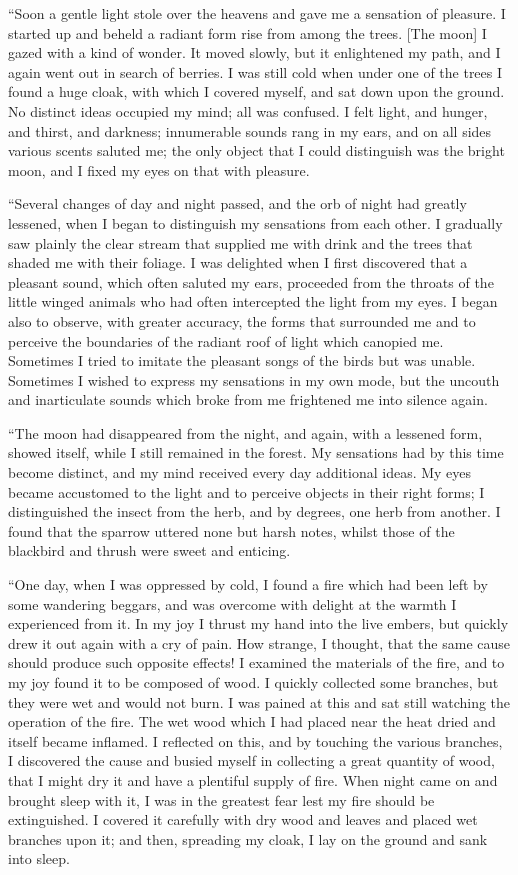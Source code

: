 \documentclass[12pt,openright]{book}
\begin{document}
“Soon a gentle light stole over the heavens and gave me a sensation of pleasure. I started up and beheld a radiant form rise from among the trees. [The moon] I gazed with a kind of wonder. It moved slowly, but it enlightened my path, and I again went out in search of berries. I was still cold when under one of the trees I found a huge cloak, with which I covered myself, and sat down upon the ground. No distinct ideas occupied my mind; all was confused. I felt light, and hunger, and thirst, and darkness; innumerable sounds rang in my ears, and on all sides various scents saluted me; the only object that I could distinguish was the bright moon, and I fixed my eyes on that with pleasure.

“Several changes of day and night passed, and the orb of night had greatly lessened, when I began to distinguish my sensations from each other. I gradually saw plainly the clear stream that supplied me with drink and the trees that shaded me with their foliage. I was delighted when I first discovered that a pleasant sound, which often saluted my ears, proceeded from the throats of the little winged animals who had often intercepted the light from my eyes. I began also to observe, with greater accuracy, the forms that surrounded me and to perceive the boundaries of the radiant roof of light which canopied me. Sometimes I tried to imitate the pleasant songs of the birds but was unable. Sometimes I wished to express my sensations in my own mode, but the uncouth and inarticulate sounds which broke from me frightened me into silence again.

“The moon had disappeared from the night, and again, with a lessened form, showed itself, while I still remained in the forest. My sensations had by this time become distinct, and my mind received every day additional ideas. My eyes became accustomed to the light and to perceive objects in their right forms; I distinguished the insect from the herb, and by degrees, one herb from another. I found that the sparrow uttered none but harsh notes, whilst those of the blackbird and thrush were sweet and enticing.

“One day, when I was oppressed by cold, I found a fire which had been left by some wandering beggars, and was overcome with delight at the warmth I experienced from it. In my joy I thrust my hand into the live embers, but quickly drew it out again with a cry of pain. How strange, I thought, that the same cause should produce such opposite effects! I examined the materials of the fire, and to my joy found it to be composed of wood. I quickly collected some branches, but they were wet and would not burn. I was pained at this and sat still watching the operation of the fire. The wet wood which I had placed near the heat dried and itself became inflamed. I reflected on this, and by touching the various branches, I discovered the cause and busied myself in collecting a great quantity of wood, that I might dry it and have a plentiful supply of fire. When night came on and brought sleep with it, I was in the greatest fear lest my fire should be extinguished. I covered it carefully with dry wood and leaves and placed wet branches upon it; and then, spreading my cloak, I lay on the ground and sank into sleep.
\end{document}

